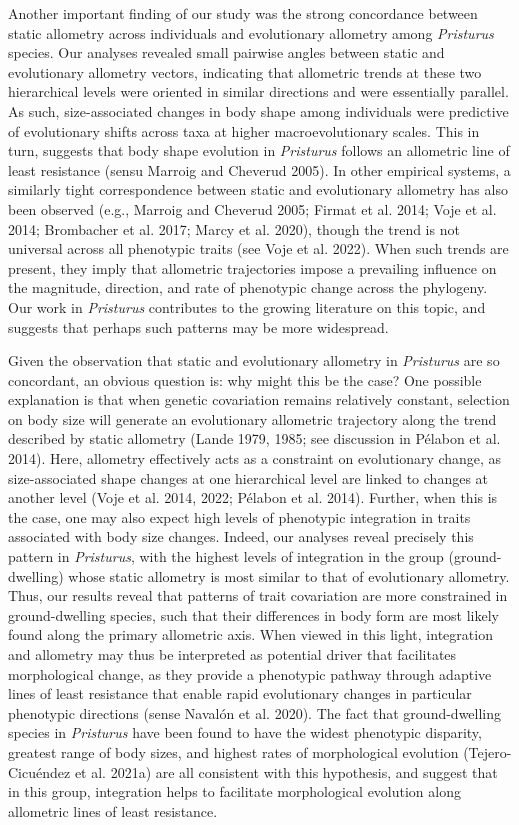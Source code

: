 \documentclass[
  11pt,
]{article}
\begin{document}
Another important finding of our study was the strong concordance
between static allometry across individuals and evolutionary allometry
among \emph{Pristurus} species. Our analyses revealed small pairwise
angles between static and evolutionary allometry vectors, indicating
that allometric trends at these two hierarchical levels were oriented in
similar directions and were essentially parallel. As such,
size-associated changes in body shape among individuals were predictive
of evolutionary shifts across taxa at higher macroevolutionary scales.
This in turn, suggests that body shape evolution in \emph{Pristurus}
follows an allometric line of least resistance (sensu Marroig and
Cheverud 2005). In other empirical systems, a similarly tight
correspondence between static and evolutionary allometry has also been
observed (e.g., Marroig and Cheverud 2005; Firmat et al. 2014; Voje et
al. 2014; Brombacher et al. 2017; Marcy et al. 2020), though the trend
is not universal across all phenotypic traits (see Voje et al. 2022).
When such trends are present, they imply that allometric trajectories
impose a prevailing influence on the magnitude, direction, and rate of
phenotypic change across the phylogeny. Our work in \emph{Pristurus}
contributes to the growing literature on this topic, and suggests that
perhaps such patterns may be more widespread.\hfill\break

Given the observation that static and evolutionary allometry in
\emph{Pristurus} are so concordant, an obvious question is: why might
this be the case? One possible explanation is that when genetic
covariation remains relatively constant, selection on body size will
generate an evolutionary allometric trajectory along the trend described
by static allometry (Lande 1979, 1985; see discussion in Pélabon et al.
2014). Here, allometry effectively acts as a constraint on evolutionary
change, as size-associated shape changes at one hierarchical level are
linked to changes at another level (Voje et al. 2014, 2022; Pélabon et
al. 2014). Further, when this is the case, one may also expect high
levels of phenotypic integration in traits associated with body size
changes. Indeed, our analyses reveal precisely this pattern in
\emph{Pristurus}, with the highest levels of integration in the group
(ground-dwelling) whose static allometry is most similar to that of
evolutionary allometry. Thus, our results reveal that patterns of trait
covariation are more constrained in ground-dwelling species, such that
their differences in body form are most likely found along the primary
allometric axis. When viewed in this light, integration and allometry
may thus be interpreted as potential driver that facilitates
morphological change, as they provide a phenotypic pathway through
adaptive lines of least resistance that enable rapid evolutionary
changes in particular phenotypic directions (sense Navalón et al. 2020).
The fact that ground-dwelling species in \emph{Pristurus} have been
found to have the widest phenotypic disparity, greatest range of body
sizes, and highest rates of morphological evolution (Tejero-Cicuéndez et
al. 2021a) are all consistent with this hypothesis, and suggest that in
this group, integration helps to facilitate morphological evolution
along allometric lines of least resistance. \hfill\break
\end{document}
